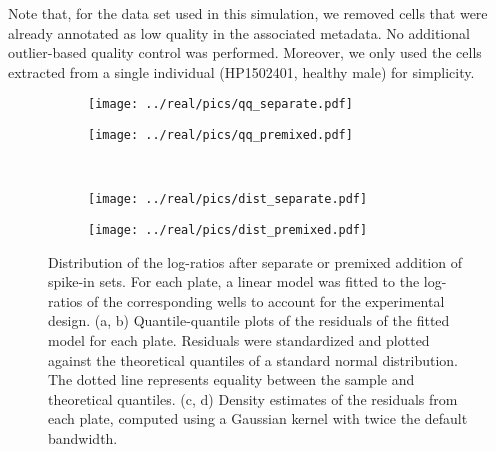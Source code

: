 \documentclass{article}
\begin{document}
Note that, for the data set used in this simulation, we removed cells that were already annotated as low quality in the associated metadata.
No additional outlier-based quality control was performed.
Moreover, we only used the cells extracted from a single individual (HP1502401, healthy male) for simplicity.

\printbibliography

\newpage
\begin{figure}[btp]
    \begin{center}
        \begin{subfigure}{0.49\textwidth}
            \texttt{[image: ../real/pics/qq\_separate.pdf]}
            \caption{}
        \end{subfigure}
        \begin{subfigure}{0.49\textwidth}
            \texttt{[image: ../real/pics/qq\_premixed.pdf]}
            \caption{}
        \end{subfigure} \\[0.1in]
        \begin{subfigure}{0.49\textwidth}
            \texttt{[image: ../real/pics/dist\_separate.pdf]}
            \caption{}
        \end{subfigure}
        \begin{subfigure}{0.49\textwidth}
            \texttt{[image: ../real/pics/dist\_premixed.pdf]}
            \caption{}
        \end{subfigure}
    \end{center}
    \caption{
        Distribution of the log-ratios after separate or premixed addition of spike-in sets.
        For each plate, a linear model was fitted to the log-ratios of the corresponding wells to account for the experimental design.
        (a, b) Quantile-quantile plots of the residuals of the fitted model for each plate.
        Residuals were standardized and plotted against the theoretical quantiles of a standard normal distribution.
        The dotted line represents equality between the sample and theoretical quantiles.
        (c, d) Density estimates of the residuals from each plate, computed using a Gaussian kernel with twice the default bandwidth.
    }
\end{figure}
\end{document}
